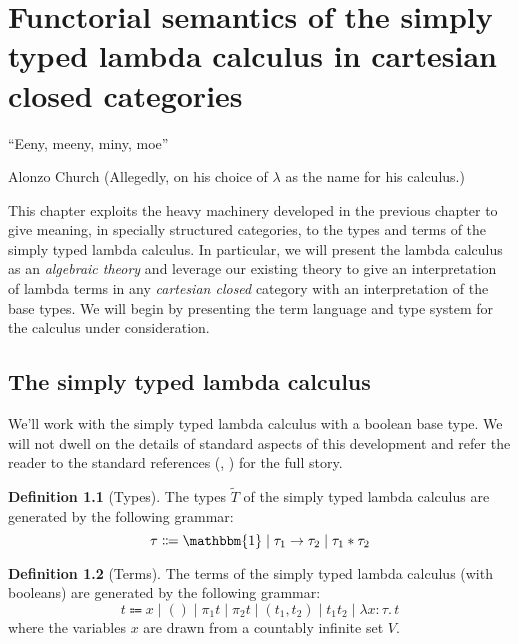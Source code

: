\documentclass[12pt,twoside]{reedthesis}
\theoremstyle{definition}
\newtheorem{definition}{Definition}
\theoremstyle{remark}
\theoremstyle{plain}
\begin{document}
\chapter{Functorial semantics of the simply typed lambda calculus in cartesian closed categories}
\epigraph{``Eeny, meeny, miny, moe''}{Alonzo Church (Allegedly, on his choice of
  $\lambda$ as the name for his calculus.)}

This chapter exploits the heavy machinery developed in the previous chapter to
give meaning, in specially structured categories, to the types and terms of the
simply typed lambda calculus. In particular, we will present the lambda calculus
as an \emph{algebraic theory} and leverage our existing theory to give an
interpretation of lambda terms in any \emph{cartesian closed} category with an
interpretation of the base types. We will begin by presenting the term language
and type system for the calculus under consideration.

\section{The simply typed lambda calculus}
We'll work with the simply typed lambda calculus with a boolean base type. We
will not dwell on the details of standard aspects of this development and refer
the reader to the standard references (\cite{pierce_types_2002},
\cite{harper_practical_2016}) for the full story.

\newcommand{\termob}{\mathbbm{1}}
\newcommand{\bool}{\mathbb{B}}


\begin{definition}[Types]\label{def:stlc_types}
  The types \( \widetilde{T} \) of the simply typed lambda calculus are
  generated by the following grammar:
  \[
    \tau \Coloneqq \termob \mid \tau_{1} \rightarrow \tau_{2} \mid \tau_{1} * \tau_{2}
  \]
\end{definition}

\newcommand{\abstr}[3]{\lambda #1 : #2.\, #3}

\begin{definition}[Terms]
  The terms of the simply typed lambda calculus (with booleans) are generated by the
  following grammar:
  \[
    t \Coloneq x \mid () \mid \pi_{1} t \mid \pi_{2} t \mid (t_{1}, t_{2}) \mid t_{1} t_{2} \mid \abstr{x}{\tau}{t}
  \]
  where the variables $x$ are drawn from a countably infinite set \( V \).
\end{definition}
\end{document}
